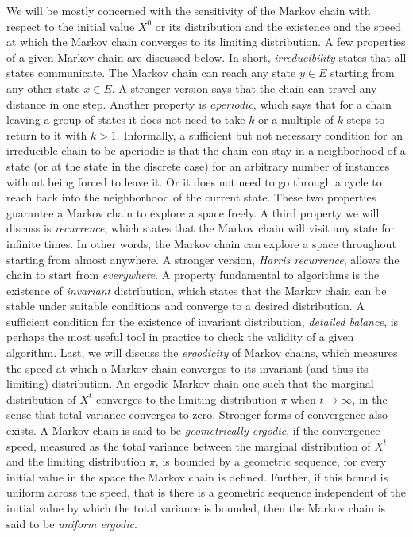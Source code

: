 We will be mostly concerned with the sensitivity of the Markov chain with
respect to the initial value $X^0$ or its distribution and the existence and
the speed at which the Markov chain converges to its limiting distribution. A
few properties of a given Markov chain are discussed below. In short,
\emph{irreducibility} states that all states communicate. The Markov chain
can reach any state $y\in E$ starting from any other state $x\in E$. A
stronger version says that the chain can travel any distance in one step.
Another property is \emph{aperiodic}, which says that for a chain leaving a
group of states it does not need to take $k$ or a multiple of $k$ steps to
return to it with $k>1$. Informally, a sufficient but not necessary condition
for an irreducible chain to be aperiodic is that the chain can stay in a
neighborhood of a state (or at the state in the discrete case) for an
arbitrary number of instances without being forced to leave it. Or it does
not need to go through a cycle to reach back into the neighborhood of the
current state. These two properties guarantee a Markov chain to explore a
space freely. A third property we will discuss is \emph{recurrence}, which
states that the Markov chain will visit any state for infinite times. In
other words, the Markov chain can explore a space throughout starting from
almost anywhere. A stronger version, \emph{Harris recurrence}, allows the
chain to start from \emph{everywhere}. A property fundamental to \mcmc
algorithms is the existence of \emph{invariant} distribution, which states
that the Markov chain can be stable under suitable conditions and converge to
a desired distribution. A sufficient condition for the existence of invariant
distribution, \emph{detailed balance}, is perhaps the most useful tool in
practice to check the validity of a given algorithm. Last, we will discuss
the \emph{ergodicity} of Markov chains, which measures the speed at which a
Markov chain converges to its invariant (and thus its limiting) distribution.
An ergodic Markov chain one such that the marginal distribution of $X^t$
converges to the limiting distribution $\pi$ when $t\to\infty$, in the sense
that total variance converges to zero. Stronger forms of convergence also
exists. A Markov chain is said to be \emph{geometrically ergodic}, if the
convergence speed, measured as the total variance between the marginal
distribution of $X^t$ and the limiting distribution $\pi$, is bounded by a
geometric sequence, for every initial value in the space the Markov chain is
defined. Further, if this bound is uniform across the speed, that is there is
a geometric sequence independent of the initial value by which the total
variance is bounded, then the Markov chain is said to be \emph{uniform
ergodic}.

